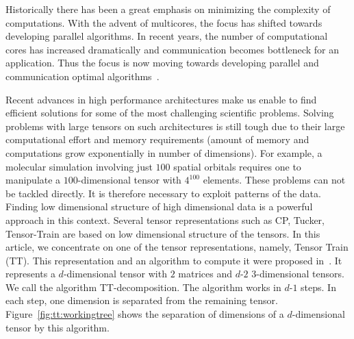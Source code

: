 \documentclass[sigconf]{acmart}
\begin{document}
Historically there has been a great emphasis on minimizing the complexity of computations. With the advent of multicores, the focus has shifted towards developing parallel algorithms. In recent years, the number of computational cores has increased dramatically and communication becomes bottleneck for an application. Thus the focus is now moving towards developing parallel and communication optimal algorithms~\cite{qr-lu-2012,Ballard-mcnla-2011}.

Recent advances in high performance architectures make us enable to find efficient solutions for some of the most challenging scientific problems. Solving problems with large tensors on such architectures is still tough due to their large computational effort and memory requirements (amount of memory and computations grow exponentially in number of dimensions). For example, a molecular simulation involving just $100$ spatial orbitals requires one to manipulate a $100$-dimensional tensor with $4^{100}$ elements. These problems can not be tackled directly. It is therefore necessary to exploit patterns of the data. Finding low dimensional structure of high dimensional data is a powerful approach in this context. Several tensor representations such as CP, Tucker, Tensor-Train are based on low dimensional structure of the tensors. In this article, we concentrate on one of the tensor representations, namely, Tensor Train (TT). This representation and an algorithm to compute it were proposed in~\cite{tt}. It represents a $d$-dimensional tensor with $2$ matrices and $d$-$2$ 3-dimensional tensors. We call the algorithm TT-decomposition. The algorithm works in $d$-$1$ steps. In each step, one dimension is separated from the remaining tensor. Figure~\ref{fig:tt:workingtree} shows the separation of dimensions of a $d$-dimensional tensor by this algorithm.
\end{document}

